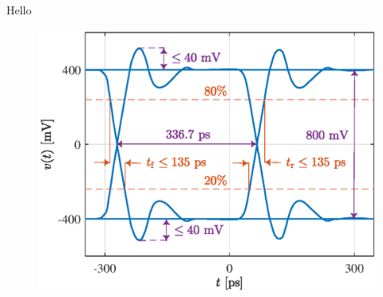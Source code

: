 \documentclass{article}
\begin{document}
Hello

\begin{figure}[!t]
	\includegraphics[width=0.8\linewidth]{someps.eps}
\end{figure}
\end{document}
